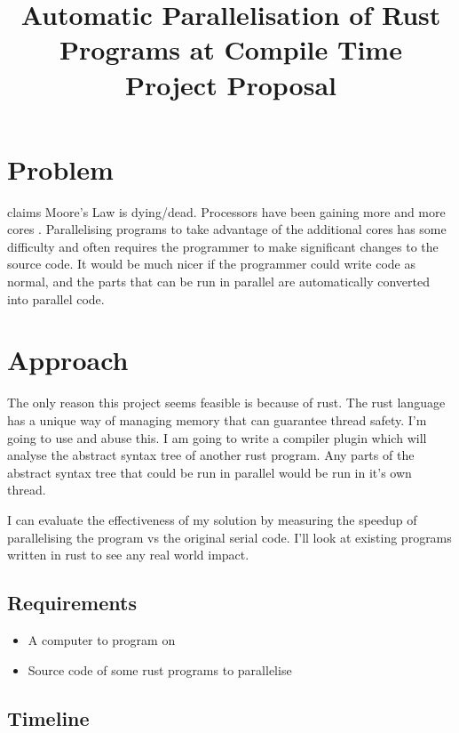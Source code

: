 \documentclass[12pt, a4paper]{article}
\title{
	\vspace{-4ex}
	\LARGE\textbf{Automatic Parallelisation of Rust Programs at Compile Time} \\
	\vspace{1ex}
	\large\textbf{Project Proposal}
	\vspace{-9ex}
}
\date{}
\begin{document}
\maketitle

\section{Problem}
\textcite{kish2002end} claims Moore's Law is dying/dead. Processors have been gaining more and more cores \parencite{geer2005chip}. Parallelising programs to take advantage of the additional cores has some difficulty and often requires the programmer to make significant changes to the source code. It would be much nicer if the programmer could write code as normal, and the parts that can be run in parallel are automatically converted into parallel code.

\section{Approach}
The only reason this project seems feasible is because of rust.
The rust language has a unique way of managing memory that can guarantee thread safety. I'm going to use and abuse this. I am going to write a compiler plugin which will analyse the abstract syntax tree of another rust program. Any parts of the abstract syntax tree that could be run in parallel would be run in it's own thread.

I can evaluate the effectiveness of my solution by measuring the speedup of parallelising the program vs the original serial code. I'll look at existing programs written in rust to see any real world impact.

\subsection{Requirements}
\begin{itemize}
	\item A computer to program on
	\item Source code of some rust programs to parallelise
\end{itemize}

\subsection{Timeline}
\\
\end{document}
